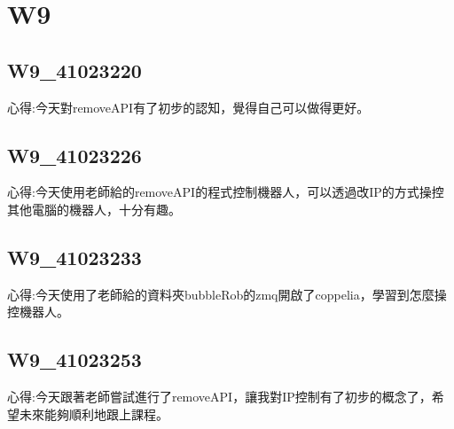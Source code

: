 \chapter{W9}


\section{W9\_41023220}

心得:今天對removeAPI有了初步的認知，覺得自己可以做得更好。

\section{W9\_41023226}

心得:今天使用老師給的removeAPI的程式控制機器人，可以透過改IP的方式操控其他電腦的機器人，十分有趣。

\section{W9\_41023233}

心得:今天使用了老師給的資料夾bubbleRob的zmq開啟了coppelia，學習到怎麼操控機器人。

\section{W9\_41023253}

心得:今天跟著老師嘗試進行了removeAPI，讓我對IP控制有了初步的概念了，希望未來能夠順利地跟上課程。

